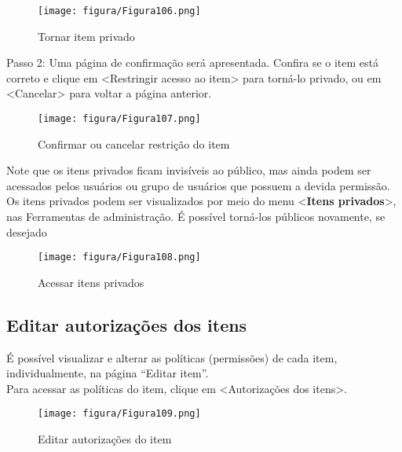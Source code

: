 \documentclass[12pt,hidelinks]{article}
\begin{document}
    \begin{figure}[!htp]
                \centering
                \texttt{[image: figura/Figura106.png]}
                \caption{Tornar item privado}
            \label{Rotulo}
        \end{figure}
    
    Passo 2: Uma página de confirmação será apresentada. Confira se o item está correto e clique em <Restringir acesso ao item> para torná-lo privado, ou em <Cancelar> para voltar a página anterior.
    
    \begin{figure}[!htp]
                \centering
                \texttt{[image: figura/Figura107.png]}
                \caption{Confirmar ou cancelar restrição do item}
            \label{Rotulo}
        \end{figure}
        
\newpage

    Note que os itens privados ficam invisíveis ao público, mas ainda podem ser acessados pelos usuários ou grupo de usuários que possuem a devida permissão. Os itens privados podem ser visualizados por meio do menu <\textbf{Itens privados}>, nas Ferramentas de administração. É possível torná-los públicos novamente, se desejado
    
    \begin{figure}[!htp]
                \centering
                \texttt{[image: figura/Figura108.png]}
                \caption{Acessar itens privados}
            \label{Rotulo}
        \end{figure}
    
    \subsection{Editar autorizações dos itens}
    
    É possível visualizar e alterar as políticas (permissões) de cada item, individualmente, na página “Editar item”. \\
    
    Para acessar as políticas do item, clique em <Autorizações dos itens>.
    
    \begin{figure}[!htp]
                \centering
                \texttt{[image: figura/Figura109.png]}
                \caption{Editar autorizações do item}
            \label{Rotulo}
        \end{figure}
\end{document}
